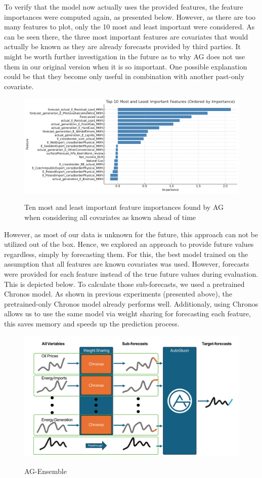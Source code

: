 \documentclass[a4paper]{article}
\begin{document}
To verify that the model now actually uses the provided features, the
feature importances were computed again, as presented below. However, as
there are too many features to plot, only the 10 most and least
important were considered. As can be seen there, the three most
important features are covariates that would actually be known as they
are already forecasts provided by third parties. It might be worth
further investigation in the future as to why AG does not use them in
our original version when it is so important. One possible explanation
could be that they become only useful in combination with another
past-only covariate.

    \begin{figure}
\centering
{\includegraphics[keepaspectratio]{src/feature_importance_plot.pdf}}
\caption{Ten most and least important feature importances found by AG
when considering all covariates as known ahead of time}
\end{figure}

    However, as most of our data is unknown for the future, this approach
can not be utilized out of the box. Hence, we explored an approach to
provide future values regardless, simply by forecasting them. For this,
the best model trained on the assumption that all features are known
covariates was used. However, forecasts were provided for each feature
instead of the true future values during evaluation. This is depicted
below. To calculate those sub-forecasts, we used a pretrained Chronos
model. As shown in previous experiments (presented above), the
pretrained-only Chronos model already performs well. Additionaly, using
Chronos allows us to use the same model via weight sharing for
forecasting each feature, this saves memory and speeds up the prediction
process.

\begin{figure}
\centering
{\includegraphics[keepaspectratio]{src/AG-Ensemble2.pdf}}
\caption{AG-Ensemble}
\end{figure}
\end{document}
